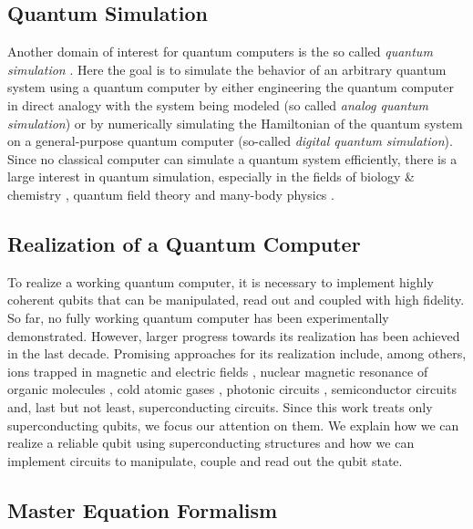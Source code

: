 \subsection{Quantum Simulation}

Another domain of interest for quantum computers is the so called {\it quantum simulation} \citep{lloyd_universal_1996}. Here the goal is to simulate the behavior of an arbitrary quantum system using a quantum computer by either engineering the quantum computer in direct analogy with the system being modeled (so called {\it analog quantum simulation}) or by numerically simulating the Hamiltonian of the quantum system on a general-purpose quantum computer (so-called {\it digital quantum simulation}). Since no classical computer can simulate a quantum system efficiently, there is a large interest in quantum simulation, especially in the fields of biology \& chemistry \citep{barreiro_open-system_2011}, quantum field theory \citep{gerritsma_quantum_2010,freedman_simulation_2002} and many-body physics \citep{simon_quantum_2011}.

\subsection{Realization of a Quantum Computer}

To realize a working quantum computer, it is necessary to implement highly coherent qubits that can be manipulated, read out and coupled with high fidelity. So far, no fully working quantum computer has been experimentally demonstrated. However, larger progress towards its realization has been achieved in the last decade. Promising approaches for its realization include, among others, ions trapped in magnetic and electric fields \citep{monroe_demonstration_1995,cirac_quantum_1995}, nuclear magnetic resonance of organic molecules \citep{jones_nmr_2001,vandersypen_experimental_2001}, cold atomic gases \citep{briegel_quantum_2000}, photonic circuits \citep{knill_scheme_2001}, semiconductor circuits \citep{loss_quantum_1998} and, last but not least, superconducting circuits. Since this work treats only superconducting qubits, we focus our attention on them. We explain how we can realize a reliable qubit using superconducting structures and how we can implement circuits to manipulate, couple and read out the qubit state.

\subsection{Master Equation Formalism} \label{section:master_equation}

